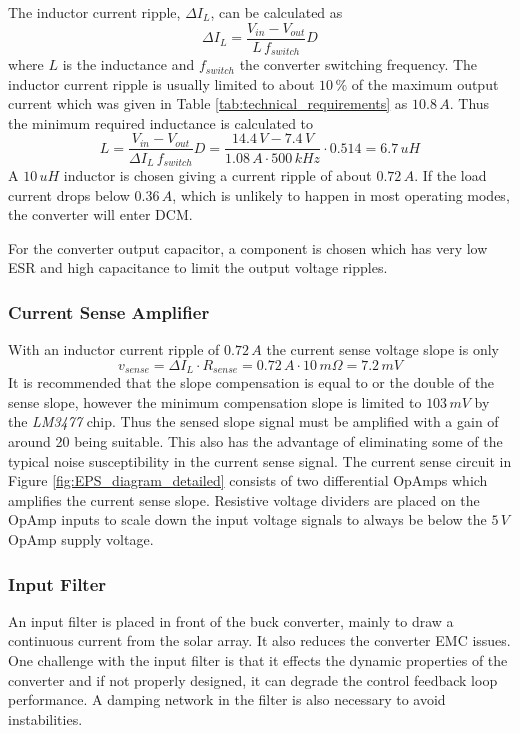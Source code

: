 The inductor current ripple, $\Delta I_L$, can be calculated as 
%
\begin{equation}
\Delta I_L=\dfrac{V_{in}-V_{out}}{L\,f_{switch}}D
\end{equation}
%
where $L$ is the inductance and $f_{switch}$ the converter switching frequency. The inductor current ripple is usually limited to about $10\,\%$ of the maximum output current which was given in Table \ref{tab:technical_requirements} as $10.8\,A$. Thus the minimum required inductance is calculated to
%
\begin{equation}
L=\dfrac{V_{in}-V_{out}}{\Delta I_L\,f_{switch}}D=\dfrac{14.4\,V-7.4\,V}{1.08\,A\cdot 500\,kHz}\cdot 0.514=6.7\,uH
\end{equation}
%
A $10\,uH$ inductor is chosen giving a current ripple of about $0.72\,A$. If the load current drops below $0.36\,A$, which is unlikely to happen in most operating modes, the converter will enter \ac{DCM}.

For the converter output capacitor, a component is chosen which has very low \ac{ESR} and high capacitance to limit the output voltage ripples.
%
\subsubsection*{Current Sense Amplifier}
With an inductor current ripple of $0.72\,A$ the current sense voltage slope is only 
%
\begin{equation}
v_{sense}=\Delta I_L\cdot R_{sense}=0.72\,A\cdot 10\,m\Omega = 7.2\,mV
\end{equation}
%
It is recommended that the slope compensation is equal to or the double of the sense slope\cite[sec. 12-1]{Fundamentals}, however the minimum compensation slope is limited to $103\,mV$ by the \textit{LM3477} chip. Thus the sensed slope signal must be amplified with a gain of around 20 being suitable. This also has the advantage of eliminating some of the typical noise susceptibility in the current sense signal. The current sense circuit in Figure \ref{fig:EPS_diagram_detailed} consists of two differential OpAmps which amplifies the current sense slope. Resistive voltage dividers are placed on the OpAmp inputs to scale down the input voltage signals to always be below the $5\,V$ OpAmp supply voltage.
%
\subsubsection*{Input Filter}
An input filter is placed in front of the buck converter, mainly to draw a continuous current from the solar array. It also reduces the converter \ac{EMC} issues. 
One challenge with the input filter is that it effects the dynamic properties of the converter and if not properly designed, it can degrade the control feedback loop performance. A damping network in the filter is also necessary to avoid instabilities\cite[sec. 10-3]{Fundamentals}.


